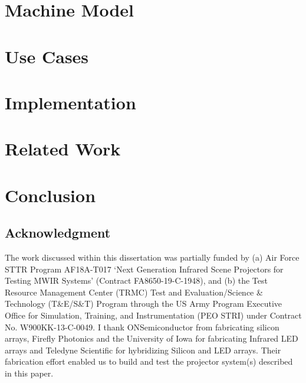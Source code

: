 \documentclass{udthesis}
\begin{document}
    \chapter{Machine Model}
        
    \chapter{Use Cases}
        
    \chapter{Implementation}
        
    \chapter{Related Work}
        
    \chapter*{Conclusion}
        

    \section*{Acknowledgment}
        The work discussed within this dissertation was partially funded by (a) Air Force STTR Program AF18A-T017 `Next Generation Infrared Scene Projectors for Testing MWIR Systems' (Contract FA8650-19-C-1948), and (b) the Test Resource Management Center (TRMC) Test and Evaluation/Science \& Technology (T\&E/S\&T) Program through the US Army Program Executive Office for Simulation, Training, and Instrumentation (PEO STRI) under Contract No. W900KK-13-C-0049. I thank ONSemiconductor from fabricating silicon arrays, Firefly Photonics and the University of Iowa for fabricating Infrared LED arrays and Teledyne Scientific for hybridizing Silicon and LED arrays. Their fabrication effort enabled us to build and test the projector system(s) described in this paper.
\end{document}
